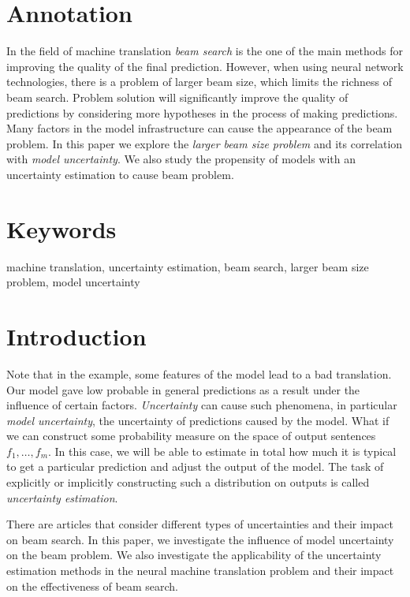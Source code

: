 \documentclass[a4paper,14pt]{extarticle}
\begin{document}
	\newpage

	{
		\hypersetup{linkcolor=black}
		\tableofcontents
	}

	\newpage
	
	\section{Annotation}
	In the field of machine translation \textit{beam search} is the one of the main methods for improving the quality of the final prediction. However, when using neural network technologies, there is a problem of larger beam size, which limits the richness of beam search. Problem solution will significantly improve the quality of predictions by considering more hypotheses in the process of making predictions. Many factors in the model infrastructure can cause the appearance of the beam problem. In this paper we explore the \textit{larger beam size problem} and its correlation with \textit{model uncertainty}. We also study the propensity of models with an uncertainty estimation to cause beam problem.
	
	\section{Keywords}
		machine translation, uncertainty estimation, beam search, larger beam size problem, model uncertainty
		
	\section{Introduction}
	Note that in the example, some features of the model lead to a bad translation. Our model gave low probable in general predictions as a result under the influence of certain factors. \textit{Uncertainty} can cause such phenomena, in particular \textit{model uncertainty}, the uncertainty of predictions caused by the model. What if we can construct some probability measure on the space of output sentences $f_1, \dots, f_m$. In this case, we will be able to estimate in total how much it is typical to get a particular prediction and adjust the output of the model. The task of explicitly or implicitly constructing such a distribution on outputs is called \textit{uncertainty estimation}.
	
	There are articles that consider different types of uncertainties and their impact on beam search. In this paper, we investigate the influence of model uncertainty on the beam problem. We also investigate the applicability of the uncertainty estimation methods in the neural machine translation problem and their impact on the effectiveness of beam search.
	
\end{document}
